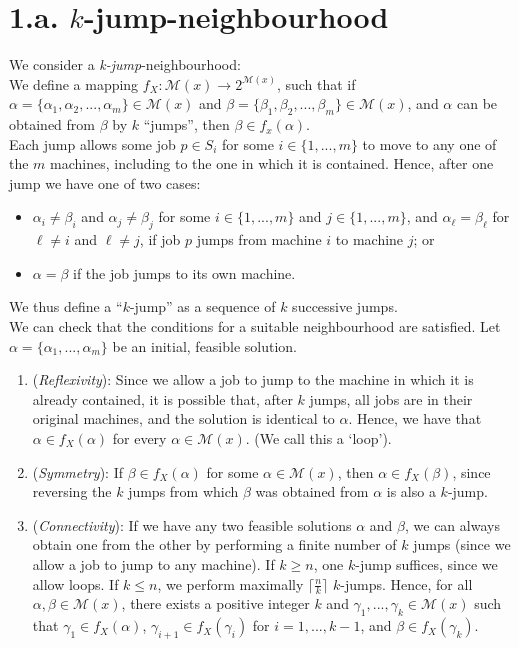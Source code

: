 \documentclass[12pt,a4paper,reqno]{article}
\begin{document}
\section*{1.a. $k$-jump-neighbourhood}

We consider a \textit{k-jump}-neighbourhood: \\

We define a mapping $f_X: \mathcal{M}(x) \rightarrow 2^{\mathcal{M}(x)}$, such that if $\alpha = \{\alpha_1,\alpha_2,...,\alpha_m \} \in \mathcal{M}(x)$ and $\beta = \{\beta_1,\beta_2,...,\beta_m \} \in \mathcal{M}(x)$, and $\alpha$ can be obtained from $\beta$ by $k$ ``jumps'', then $\beta\in f_x(\alpha)$. \\

Each jump allows some job $p \in S_i$ for some $i \in \{1,...,m\}$ to move to any one of the $m$ machines, including to the one in which it is contained. Hence, after one jump we have one of two cases:
\begin{itemize}
\item $\alpha_i \neq \beta_i$ and $\alpha_j \neq \beta_j$ for some $i \in \{1,...,m\}$ and $j \in \{1,...,m\}$, and $\alpha_\ell = \beta_\ell$ for $\ell \neq i$ and $\ell \neq j$, if job $p$ jumps from machine $i$ to machine $j$; or
\item $\alpha = \beta$ if the job jumps to its own machine.
\end{itemize}

We thus define a ``$k$-jump'' as a sequence of $k$ successive jumps. \\

We can check that the conditions for a suitable neighbourhood are satisfied. Let $\alpha = \{\alpha_1,...,\alpha_m\}$ be an initial, feasible solution.
\begin{enumerate}

\item (\textit{Reflexivity}): Since we allow a job to jump to the machine in which it is already contained, it is possible that, after $k$ jumps, all jobs are in their original machines, and the solution is identical to $\alpha$. Hence, we have that $\alpha \in f_X(\alpha)$ for every $\alpha \in \mathcal{M}(x)$. (We call this a `loop').

\item (\textit{Symmetry}): If $\beta \in f_X(\alpha)$ for some $\alpha \in \mathcal{M}(x)$, then $\alpha \in f_X(\beta)$, since reversing the $k$ jumps from which $\beta$ was obtained from $\alpha$ is also a $k$-jump.

\item (\textit{Connectivity}): If we have any two feasible solutions $\alpha$ and $\beta$, we can always obtain one from the other by performing a finite number of $k$ jumps (since we allow a job to jump to any machine). If $k \geq n$, one $k$-jump suffices, since we allow loops. If $k \leq n$, we perform maximally $\lceil \frac{n}{k} \rceil$ $k$-jumps. Hence, for all $\alpha, \beta \in \mathcal{M}(x)$, there exists a positive integer $k$ and $\gamma_1,...,\gamma_k \in \mathcal{M}(x)$ such that $\gamma_1 \in f_X(\alpha)$, $\gamma_{i+1} \in f_X(\gamma_i)$ for $i=1,...,k-1$, and $\beta \in f_X(\gamma_k)$.

\end{enumerate}
\end{document}
